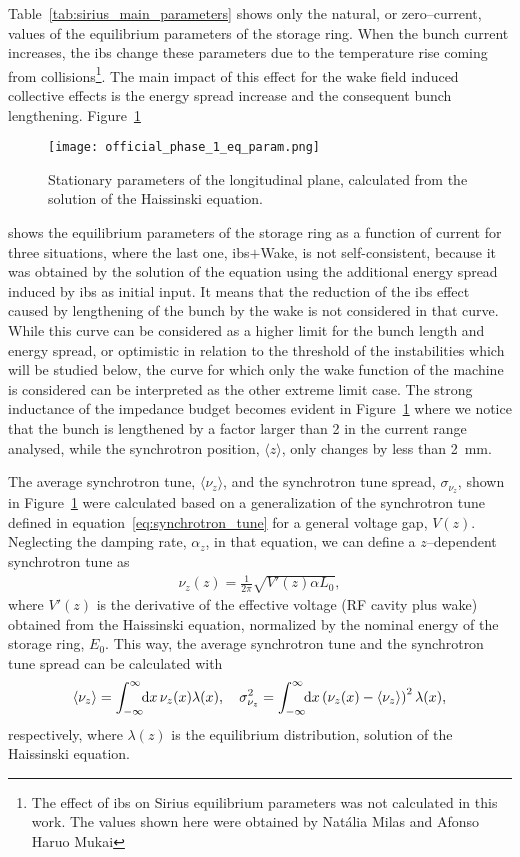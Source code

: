     Table~\ref{tab:sirius_main_parameters} shows only the natural, or zero--current, values of the equilibrium parameters of the storage ring. When the bunch current increases, the \gls{ibs} change these parameters due to the temperature rise coming from collisions\footnote{The effect of \gls{ibs} on Sirius equilibrium parameters was not  calculated in this work. The values shown here were obtained by Natália Milas and Afonso Haruo Mukai}. The main impact of this effect for the wake field induced collective effects is the energy spread increase and the consequent bunch lengthening.  Figure~\ref{fig:ph1_eq_param}
    \begin{figure}
        \centering
        \texttt{[image: official\_phase\_1\_eq\_param.png]}
        \caption{Stationary parameters of the longitudinal plane, calculated from the solution of the Haissinski equation.}
        \label{fig:ph1_eq_param}
    \end{figure}
    shows the equilibrium parameters of the storage ring as a function of current for three situations, where the last one, \gls{ibs}$+$Wake, is not self-consistent, because it was obtained by the solution of the  equation using the additional energy spread induced by \gls{ibs} as initial input. It means that the reduction of the \gls{ibs} effect caused by lengthening of the bunch by the wake is not considered in that curve. While this curve can be considered as a higher limit for the bunch length and energy spread, or optimistic in relation to the threshold of the instabilities which will be studied below, the curve for which only the wake function of the machine is considered can be interpreted as the other extreme limit case. The strong inductance of the impedance budget becomes evident in Figure~\ref{fig:ph1_eq_param} where we notice that the bunch is lengthened by a factor larger than \num{2} in the current range analysed, while the synchrotron position, $\langle z \rangle$, only changes by less than \SI{2}{\milli\meter}.

    The average synchrotron tune, $\langle \nu_z \rangle$, and the synchrotron tune spread, $\sigma_{\nu_z}$, shown in Figure~\ref{fig:ph1_eq_param} were calculated based on a generalization of the synchrotron tune defined in equation~\ref{eq:synchrotron_tune} for a general voltage gap, $V(z)$. Neglecting the damping rate, $\alpha_z$, in that equation, we can define a $z$--dependent synchrotron tune as
    \begin{align}
        \nu_z(z) = \frac{1}{2\pi}\sqrt{V'(z)\alpha L_0},
    \end{align}
    where $V'(z)$ is the derivative of the effective voltage (RF cavity plus wake) obtained from the Haissinski equation, normalized by the nominal energy of the storage ring, $E_0$. This way, the average synchrotron tune and the synchrotron tune spread can be calculated with
    \begin{align}
        \langle \nu_z \rangle = \int_{-\infty}^{\infty}\!\!\text{d}x\, \nu_z(x)\lambda(x),\quad
        \sigma_{\nu_z}^2 = \int_{-\infty}^{\infty}\!\!\text{d}x \left(\nu_z(x)-\langle \nu_z \rangle\right)^2\lambda(x),
    \end{align}
    respectively, where $\lambda(z)$ is the equilibrium distribution, solution of the Haissinski equation.

